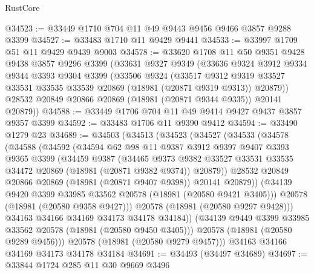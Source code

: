 \begin{lexlean}{RustCore}
\begin{coremodule}
@34523 := @33449 @1710 @704 @11 @49 @9443 @9456 @9466 @3857 @9288 @3399
@34527 := @33483 @1710 @11 @9429 @9441
@34533 := @33997 @1709 @51 @11 @9429 @9439 @9003
@34578 := @33620
    @1708
    @11
    @50
    @9351
    @9428
    @9438
    @3857
    @9296
    @3399
    (@33631
      @9327
      @9349
      (@33636
        @9324
        @3912
        @9334
        @9344
        @3393
        @9304
        @3399
        (@33506
          @9324
          (@33517
            @9312
            @9319
            @33527
            @33531
            @33535
            @33539
            @20869
            (@18981 (@20871 @9319 @9313))
            @20879))
        @28532
        @20849
        @20866
        @20869
        (@18981 (@20871 @9344 @9335))
        @20141
        @20879))
@34588 := @33449 @1706 @704 @11 @49 @9414 @9427 @9437 @3857 @9357 @3399
@34592 := @33483 @1706 @11 @9390 @9412
@34594 := @33490 @1279 @23
@34689 := @34503
    (@34513
      (@34523
        (@34527
          (@34533
            (@34578
              (@34588
                (@34592
                  (@34594
                    @62
                    @98
                    @11
                    @9387
                    @3912
                    @9397
                    @9407
                    @3393
                    @9365
                    @3399
                    (@34459
                      @9387
                      (@34465
                        @9373
                        @9382
                        @33527
                        @33531
                        @33535
                        @34472
                        @20869
                        (@18981 (@20871 @9382 @9374))
                        @20879))
                    @28532
                    @20849
                    @20866
                    @20869
                    (@18981 (@20871 @9407 @9398))
                    @20141
                    @20879))
                (@34139 @9420 @3399 @33985 @33562 @20578 (@18981 (@20580 @9421 @3405)))
                @20578
                (@18981 (@20580 @9358 @9427)))
              @20578
              (@18981 (@20580 @9297 @9428)))
            @34163
            @34166
            @34169
            @34173
            @34178
            @34184))
        (@34139 @9449 @3399 @33985 @33562 @20578 (@18981 (@20580 @9450 @3405)))
        @20578
        (@18981 (@20580 @9289 @9456)))
      @20578
      (@18981 (@20580 @9279 @9457)))
    @34163
    @34166
    @34169
    @34173
    @34178
    @34184
@34691 := @34493 (@34497 @34689)
@34697 := @33844 @1724 @285 @11 @30 @9669 @3496

\end{coremodule}
\end{lexlean}
